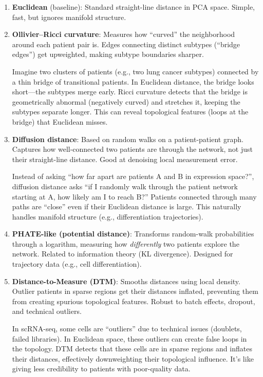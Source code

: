 \documentclass[11pt]{article}
\begin{document}
\begin{enumerate}[leftmargin=1.5em]
    \item \textbf{Euclidean} (baseline): Standard straight-line distance in PCA space. Simple, fast, but ignores manifold structure.

    \item \textbf{Ollivier--Ricci curvature}: Measures how ``curved'' the neighborhood around each patient pair is. Edges connecting distinct subtypes (``bridge edges'') get upweighted, making subtype boundaries sharper.

    \begin{analogy}
    Imagine two clusters of patients (e.g., two lung cancer subtypes) connected by a thin bridge of transitional patients. In Euclidean distance, the bridge looks short---the subtypes merge early. Ricci curvature detects that the bridge is geometrically abnormal (negatively curved) and stretches it, keeping the subtypes separate longer. This can reveal topological features (loops at the bridge) that Euclidean misses.
    \end{analogy}

    \item \textbf{Diffusion distance}: Based on random walks on a patient-patient graph. Captures how well-connected two patients are through the network, not just their straight-line distance. Good at denoising local measurement error.

    \begin{analogy}
    Instead of asking ``how far apart are patients A and B in expression space?'', diffusion distance asks ``if I randomly walk through the patient network starting at A, how likely am I to reach B?'' Patients connected through many paths are ``close'' even if their Euclidean distance is large. This naturally handles manifold structure (e.g., differentiation trajectories).
    \end{analogy}

    \item \textbf{PHATE-like (potential distance)}: Transforms random-walk probabilities through a logarithm, measuring how \emph{differently} two patients explore the network. Related to information theory (KL divergence). Designed for trajectory data (e.g., cell differentiation).

    \item \textbf{Distance-to-Measure (DTM)}: Smooths distances using local density. Outlier patients in sparse regions get their distances inflated, preventing them from creating spurious topological features. Robust to batch effects, dropout, and technical outliers.

    \begin{analogy}
    In scRNA-seq, some cells are ``outliers'' due to technical issues (doublets, failed libraries). In Euclidean space, these outliers can create false loops in the topology. DTM detects that these cells are in sparse regions and inflates their distances, effectively downweighting their topological influence. It's like giving less credibility to patients with poor-quality data.
    \end{analogy}
\end{enumerate}
\end{document}
